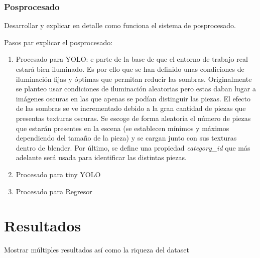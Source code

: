 \subsubsection*{Posprocesado}
\label{chap:Generación de un dataset subsec:Posprocesado}
Desarrollar y explicar en detalle como funciona el sistema de posprocesado.

Pasos par explicar el posprocesado:
\begin{enumerate}
\item Procesado para YOLO: e parte de la base de que el entorno de trabajo real estará bien iluminado. Es por ello que se han definido unas condiciones de iluminación fijas y óptimas que permitan reducir las sombras. Originalmente se planteo usar condiciones de iluminación aleatorias pero estas daban lugar a imágenes oscuras en las que apenas se podían distinguir las piezas. El efecto de las sombras se ve incrementado debido a la gran cantidad de piezas que presentas texturas oscuras. Se escoge de forma aleatoria el número de piezas que estarán presentes en la escena (se establecen mínimos y máximos dependiendo del tamaño de la pieza) y se cargan junto con sus texturas dentro de blender. Por último, se define una propiedad \textit{category\_id} que más adelante será usada para identificar las distintas piezas.
\item Procesado para tiny YOLO
\item Procesado para Regresor
\end{enumerate}

\section{Resultados}
\label{chap:Generación de un dataset sec:Resultados}
Mostrar múltiples resultados así como la riqueza del dataset

